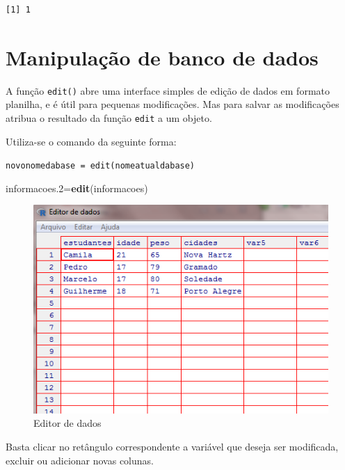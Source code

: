 \documentclass[12pt,brazil,oneside]{book}
\newenvironment{Shaded}{\begin{snugshade}}{\end{snugshade}}
\newcommand{\FloatTok}[1]{\textcolor[rgb]{0.00,0.00,0.81}{#1}}
\newcommand{\KeywordTok}[1]{\textcolor[rgb]{0.13,0.29,0.53}{\textbf{#1}}}
\newcommand{\NormalTok}[1]{#1}
\begin{document}
\begin{verbatim}
[1] 1
\end{verbatim}

\hypertarget{manipulacao-de-banco-de-dados}{%
\section{Manipulação de banco de dados}\label{manipulacao-de-banco-de-dados}}

A função \texttt{edit()} abre uma interface simples de edição de dados em formato planilha, e é útil para pequenas modificações. Mas para salvar as modificações atribua o resultado da função \texttt{edit} a um objeto.

Utiliza-se o comando da seguinte forma:

\texttt{novonomedabase\ =\ edit(nomeatualdabase)}

\begin{Shaded}
\begin{Highlighting}[]
\NormalTok{informacoes}\FloatTok{.2}\NormalTok{=}\KeywordTok{edit}\NormalTok{(informacoes)}
\end{Highlighting}
\end{Shaded}

\begin{figure}[H]

{\centering \includegraphics[width=0.7\linewidth]{95} 

}

\caption{Editor de dados}\label{fig:95}
\end{figure}

Basta clicar no retângulo correspondente a variável que deseja ser modificada, excluir ou adicionar novas colunas.
\end{document}
